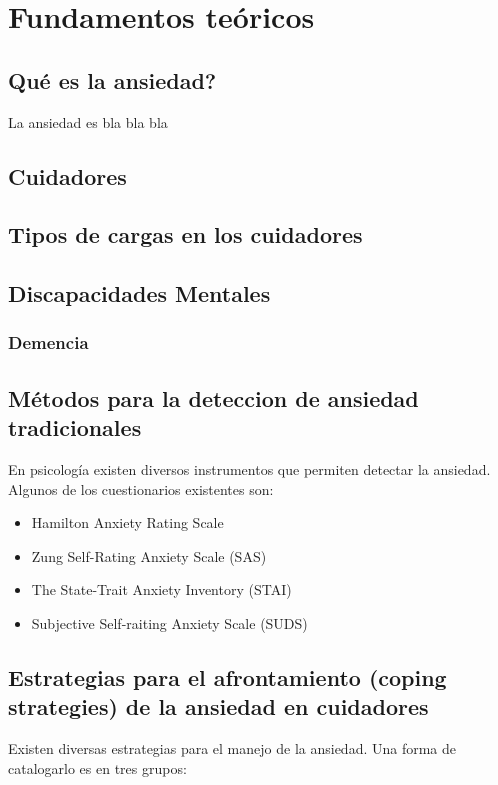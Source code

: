 \documentclass[letterpaper,12pt]{cicese}
\begin{document}
	\chapter{Fundamentos te\'oricos}
	\section{Qu\'e es la ansiedad?}
			La ansiedad es bla bla bla
			\section{Cuidadores}
		
			\section{Tipos de cargas en los cuidadores}

	\section{Discapacidades Mentales}
		\subsection{Demencia}
	\section{M\'etodos para la deteccion de ansiedad tradicionales}
	En psicolog\'ia existen diversos instrumentos que permiten detectar la ansiedad. Algunos de los cuestionarios existentes son:
	\begin{itemize}
		
		\item Hamilton Anxiety Rating Scale

		\item Zung Self-Rating Anxiety Scale (SAS)
				
		\item The State-Trait Anxiety Inventory (STAI)
		\item Subjective Self-raiting Anxiety Scale (SUDS)
	\end{itemize}

	\section{Estrategias para el afrontamiento (coping strategies) de la ansiedad en cuidadores}
	Existen diversas estrategias  para el manejo de la ansiedad. Una forma de catalogarlo es en tres grupos\citep{Cooper200615}:
	
\end{document}
